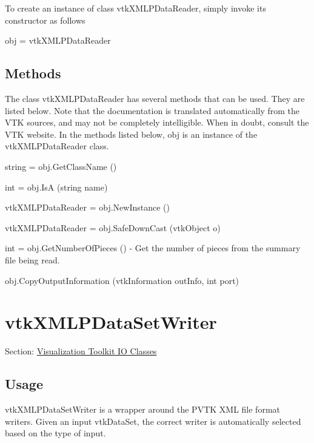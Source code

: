 To create an instance of class vtk\-X\-M\-L\-P\-Data\-Reader, simply invoke its constructor as follows \begin{DoxyVerb}  obj = vtkXMLPDataReader
\end{DoxyVerb}
 \hypertarget{vtkwidgets_vtkxyplotwidget_Methods}{}\subsection{Methods}\label{vtkwidgets_vtkxyplotwidget_Methods}
The class vtk\-X\-M\-L\-P\-Data\-Reader has several methods that can be used. They are listed below. Note that the documentation is translated automatically from the V\-T\-K sources, and may not be completely intelligible. When in doubt, consult the V\-T\-K website. In the methods listed below, {\ttfamily obj} is an instance of the vtk\-X\-M\-L\-P\-Data\-Reader class. 
\begin{DoxyItemize}
\item {\ttfamily string = obj.\-Get\-Class\-Name ()}  
\item {\ttfamily int = obj.\-Is\-A (string name)}  
\item {\ttfamily vtk\-X\-M\-L\-P\-Data\-Reader = obj.\-New\-Instance ()}  
\item {\ttfamily vtk\-X\-M\-L\-P\-Data\-Reader = obj.\-Safe\-Down\-Cast (vtk\-Object o)}  
\item {\ttfamily int = obj.\-Get\-Number\-Of\-Pieces ()} -\/ Get the number of pieces from the summary file being read.  
\item {\ttfamily obj.\-Copy\-Output\-Information (vtk\-Information out\-Info, int port)}  
\end{DoxyItemize}\hypertarget{vtkio_vtkxmlpdatasetwriter}{}\section{vtk\-X\-M\-L\-P\-Data\-Set\-Writer}\label{vtkio_vtkxmlpdatasetwriter}
Section\-: \hyperlink{sec_vtkio}{Visualization Toolkit I\-O Classes} \hypertarget{vtkwidgets_vtkxyplotwidget_Usage}{}\subsection{Usage}\label{vtkwidgets_vtkxyplotwidget_Usage}
vtk\-X\-M\-L\-P\-Data\-Set\-Writer is a wrapper around the P\-V\-T\-K X\-M\-L file format writers. Given an input vtk\-Data\-Set, the correct writer is automatically selected based on the type of input.

